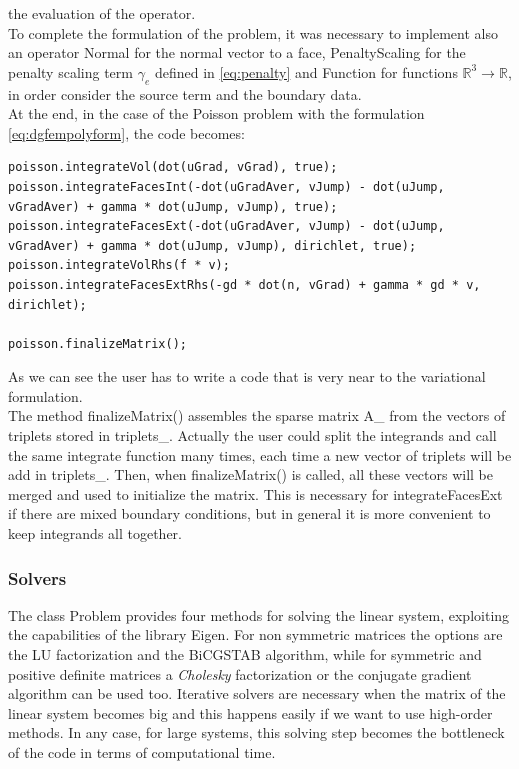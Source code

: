 \documentclass[12pt, a4paper]{article}
\newcommand{\code}[1]{{\footnotesize\ttfamily #1}}
\theoremstyle{definition}
\theoremstyle{plain}
\theoremstyle{plain}
\theoremstyle{definition}
\begin{document}
the evaluation of the operator.\\
To complete the formulation of the problem, it was necessary to implement also an operator \code{Normal} for the normal vector to a face, \code{PenaltyScaling} for the penalty scaling term $\gamma_e$ defined in \eqref{eq:penalty} and \code{Function} for functions $\mathbb{R}^3 \rightarrow \mathbb{R}$, in order consider the source term and the boundary data.\\
At the end, in the case of the Poisson problem with the formulation \eqref{eq:dgfempolyform}, the code becomes:
\begin{lstlisting}
poisson.integrateVol(dot(uGrad, vGrad), true);
poisson.integrateFacesInt(-dot(uGradAver, vJump) - dot(uJump, vGradAver) + gamma * dot(uJump, vJump), true);
poisson.integrateFacesExt(-dot(uGradAver, vJump) - dot(uJump, vGradAver) + gamma * dot(uJump, vJump), dirichlet, true);
poisson.integrateVolRhs(f * v);
poisson.integrateFacesExtRhs(-gd * dot(n, vGrad) + gamma * gd * v, dirichlet);

poisson.finalizeMatrix();
\end{lstlisting}
As we can see the user has to write a code that is very near to the 
variational formulation.\\ 
The method \code{finalizeMatrix()} assembles the sparse matrix \code{A\_} from 
the vectors of triplets stored in \code{triplets\_}. Actually the user could 
split the integrands and call the same integrate function many times, each time 
a new vector of triplets will be add in \code{triplets\_}. Then, when 
\code{finalizeMatrix()} is called, all these vectors will be merged and used to 
initialize the matrix. This is necessary for \code{integrateFacesExt} if there 
are mixed boundary conditions, but in general it is more convenient to keep 
integrands all together.\\
\subsubsection{Solvers}
The class \code{Problem} provides four methods for solving the linear system, 
exploiting the capabilities of the library Eigen. For non symmetric matrices 
the options are the LU factorization and the BiCGSTAB algorithm, while for 
symmetric and positive definite matrices a \emph{Cholesky} factorization or the 
conjugate gradient algorithm can be used too. Iterative solvers are necessary 
when the matrix of the linear system becomes big and this happens easily if we want to 
use high-order methods. In any case, for large systems, this solving step 
becomes the bottleneck of the code in terms of computational time.
\end{document}
